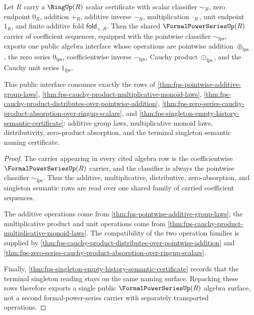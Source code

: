 \begin{theorem}
\label{thm:fps-ringup-public-algebra-interface}
Let $R$ carry a $\RingUp(R)$ scalar certificate with scalar classifier
$\sim_R$, zero endpoint $0_R$, addition $+_R$, additive inverse $-_R$,
multiplication $\cdot_R$, unit endpoint $1_R$, and finite additive fold
$\mathsf{fold}_{+,R}$. Then the shared $\FormalPowerSeriesUp(R)$ carrier of
coefficient sequences, equipped with the pointwise classifier
$\sim_{\mathrm{fps}}$, exports one public algebra interface whose operations
are pointwise addition $\oplus_{\mathrm{fps}}$, the zero series
$0_{\mathrm{fps}}$, coefficientwise inverse $-_{\mathrm{fps}}$, Cauchy product
$\odot_{\mathrm{fps}}$, and the Cauchy unit series $1_{\mathrm{fps}}$.

This public interface consumes exactly the rows of
\autoref{thm:fps-pointwise-additive-group-laws},
\autoref{thm:fps-cauchy-product-multiplicative-monoid-laws},
\autoref{thm:fps-cauchy-product-distributes-over-pointwise-addition},
\autoref{thm:fps-zero-series-cauchy-product-absorption-over-ringup-scalars},
and \autoref{thm:fps-singleton-empty-history-semantic-certificate}: additive
group laws, multiplicative monoid laws, distributivity, zero-product
absorption, and the terminal singleton semantic naming certificate.
\end{theorem}
\begin{proof}
The carrier appearing in every cited algebra row is the coefficientwise
$\FormalPowerSeriesUp(R)$ carrier, and the classifier is always the pointwise
classifier $\sim_{\mathrm{fps}}$. Thus the additive, multiplicative,
distributive, zero-absorption, and singleton semantic rows are read over one
shared family of carried coefficient sequences.

The additive operations come from
\autoref{thm:fps-pointwise-additive-group-laws}; the multiplicative product and
unit operations come from
\autoref{thm:fps-cauchy-product-multiplicative-monoid-laws}. The compatibility
of the two operation families is supplied by
\autoref{thm:fps-cauchy-product-distributes-over-pointwise-addition} and
\autoref{thm:fps-zero-series-cauchy-product-absorption-over-ringup-scalars}.

Finally, \autoref{thm:fps-singleton-empty-history-semantic-certificate} records
that the terminal singleton reading stays on the same naming surface. Repacking
these rows therefore exports a single public $\FormalPowerSeriesUp(R)$ algebra
surface, not a second formal-power-series carrier with separately transported
operations.
\end{proof}

